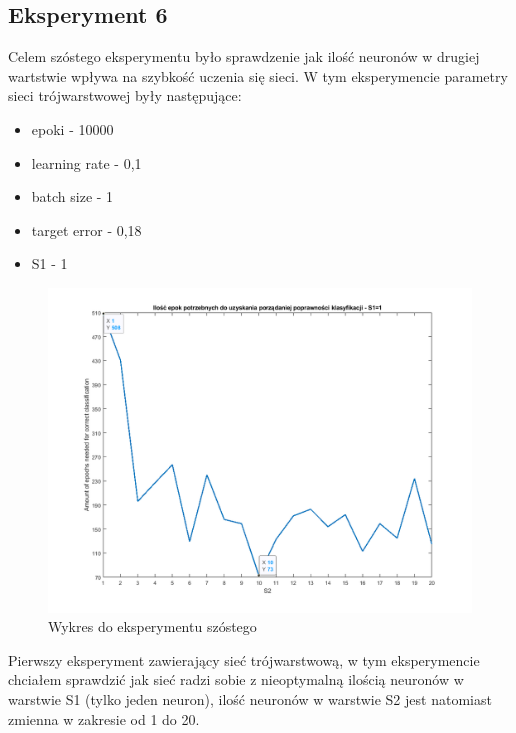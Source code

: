 \documentclass[12pt,twoside]{article}
\begin{document}
\subsection{Eksperyment 6}
Celem szóstego eksperymentu było sprawdzenie jak ilość neuronów w drugiej wartstwie wpływa na szybkość uczenia się sieci.
W tym eksperymencie parametry sieci trójwarstwowej były następujące:
\begin{itemize}
	\item epoki - 10000
	\item learning rate - 0,1
	\item batch size - 1
	\item target error - 0,18
	\item S1 - 1
\end{itemize}
\begin{figure}[ht!]
	\centering
	\includegraphics[width=14cm]{figures/S1=1_S2_epo.png}
	\caption{Wykres do eksperymentu szóstego}
\end{figure}
Pierwszy eksperyment zawierający sieć trójwarstwową, w tym eksperymencie chciałem sprawdzić jak sieć radzi sobie z nieoptymalną ilością neuronów w warstwie S1 (tylko jeden neuron), ilość neuronów w warstwie S2 jest natomiast zmienna w zakresie od 1 do 20.
\newpage
\end{document}
